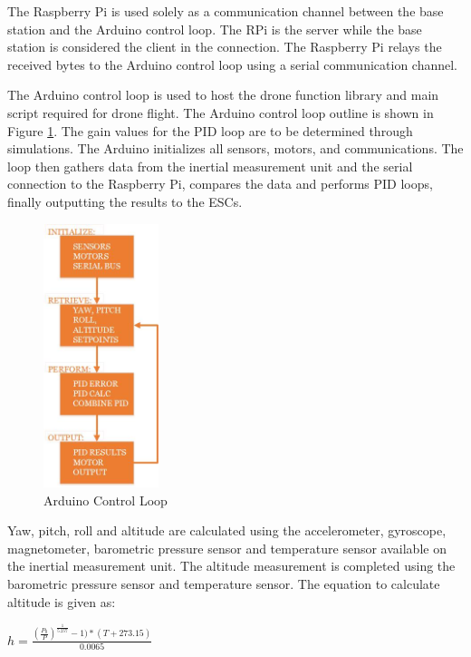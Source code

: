 The Raspberry Pi is used solely as a communication channel between the base station and the Arduino control loop. The RPi is the server while the base station is considered the client in the connection. The Raspberry Pi relays the received bytes to the Arduino control loop using a serial communication channel. 

The Arduino control loop is used to host the drone function library and main script required for drone flight. The Arduino control loop outline is shown in Figure \ref{fig:ctl_loop}. The gain values for the PID loop are to be determined through simulations. The Arduino initializes all sensors, motors, and communications. The loop then gathers data from the inertial measurement unit and the serial connection to the Raspberry Pi, compares the data and performs PID loops, finally outputting the results to the ESCs.

\begin{figure}[H]
	\centering
	\includegraphics[width=0.3\textwidth]{control-loop.jpg}
	\caption{Arduino Control Loop}
	\label{fig:ctl_loop}	
\end{figure}

Yaw, pitch, roll and altitude are calculated using the accelerometer, gyroscope, magnetometer, barometric pressure sensor and temperature sensor available on the inertial measurement unit. The altitude measurement is completed using the barometric pressure sensor and temperature sensor. The equation to calculate altitude is given as: 

\vspace*{0.2in}
$h=\frac{(\frac{P_{0}}{P})^\frac{1}{5.257}-1)*(T+273.15)}{0.0065}$
\vspace*{0.2in}

